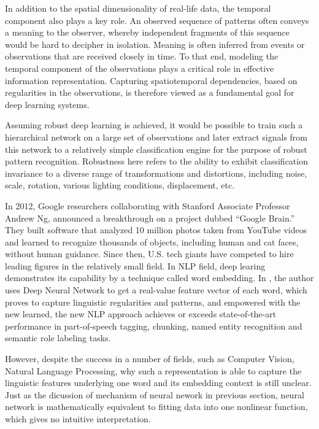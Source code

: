 \documentclass[a4paper]{book}
\begin{document}
  In addition to the spatial dimensionality of real-life data, the
  temporal component also plays a key role. An observed sequence of
  patterns often conveys a meaning to the observer, whereby
  independent fragments of this sequence would be hard to decipher in
  isolation.  Meaning is often inferred from events or observations
  that are received closely in time. To that end, modeling the
  temporal component of the observations plays a critical role in
  effective information representation. Capturing spatiotemporal
  dependencies, based on regularities in the observations, is
  therefore viewed as a fundamental goal for deep learning systems\cite{Arel:2010:RFD:1921914.1921920}.

  Assuming robust deep learning is achieved, it would be possible to
  train such a hierarchical network on a large set of observations and
  later extract signals from this network to a relatively simple
  classification engine for the purpose of robust pattern recognition.
  Robustness here refers to the ability to exhibit classification
  invariance to a diverse range of transformations and distortions,
  including noise, scale, rotation, various lighting conditions,
  displacement, etc\cite{Arel:2010:RFD:1921914.1921920}.

  In 2012, Google researchers collaborating with Stanford Associate
  Professor Andrew Ng, announced a breakthrough on a project dubbed
  “Google Brain.” They built software that analyzed 10 million photos
  taken from YouTube videos and learned to recognize thousands of
  objects, including human and cat faces, without human guidance. Since
  then, U.S.  tech giants have competed to hire leading figures in the
  relatively small field\cite{deep_learning_mit_tech_review}. In NLP field, deep learing demonstrates its
  capability by a technique called word embedding. In
  \cite{DBLP:journals/corr/abs-1103-0398}, the author uses Deep Neural
  Network to get a real-value feature vector of each word, which proves
  to capture linguistic regularities and patterns, and empowered with
  the new learned, the new NLP approach achieves or exceeds
  state-of-the-art performance in part-of-speech tagging, chunking,
  named entity recognition and semantic role labeling tasks.

  However, despite the success in a number of fields, such as Computer
  Vision, Natural Language Processing, why such a representation is
  able to capture the linguistic features underlying one word and its
  embedding context is still unclear. Just as the dicussion of
  mechanism of neural nework in previous section, neural network is
  mathematically equivalent to fitting data into one nonlinear
  function, which gives no intuitive interpretation.
\end{document}
